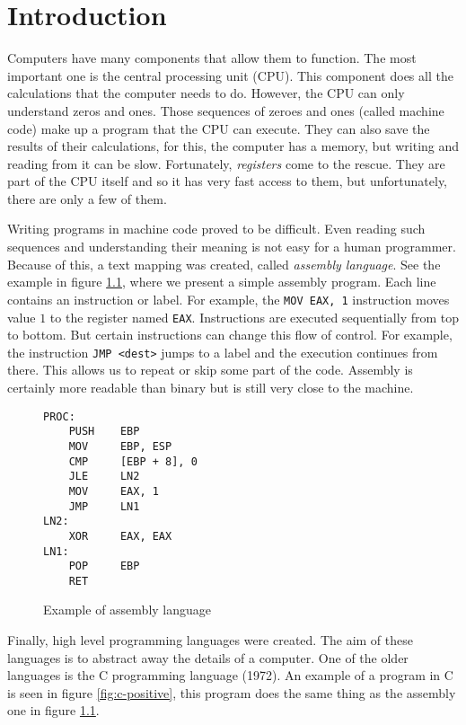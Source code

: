 \chapter{Introduction}
Computers have many components that allow them to function. The most important
one is the central processing unit (CPU). This component does all the
calculations that the computer needs to do. However, the CPU can only
understand zeros and ones. Those sequences of zeroes and ones (called machine
code) make up a program that the CPU can execute. They can also save the
results of their calculations, for this, the computer has a memory, but writing
and reading from it can be slow. Fortunately, \textit{registers} come to the
rescue. They are part of the CPU itself and so it has very fast access to them,
but unfortunately, there are only a few of them.

Writing programs in machine code proved to be difficult. Even reading such
sequences and understanding their meaning is not easy for a human programmer.
Because of this, a text mapping was created, called \textit{assembly language}.
See the example in figure \ref{fig:assembly-example}, where we present a simple
assembly program. Each line contains an instruction or label. For example, the
\texttt{MOV EAX, 1} instruction moves value $1$ to the register named
\texttt{EAX}. Instructions are executed sequentially from top to bottom. But
certain instructions can change this flow of control. For example, the
instruction \texttt{JMP <dest>} jumps to a label and the execution continues
from there. This allows us to repeat or skip some part of the code. Assembly is
certainly more readable than binary but is still very close to the machine.

\begin{figure}\label{fig:assembly-example}
\begin{lstlisting}
PROC:
    PUSH    EBP
    MOV     EBP, ESP
    CMP     [EBP + 8], 0
    JLE     LN2
    MOV     EAX, 1
    JMP     LN1
LN2:
    XOR     EAX, EAX
LN1:
    POP     EBP
    RET
\end{lstlisting}
\caption{Example of assembly language}
\end{figure}

Finally, high level programming languages were created. The aim of these
languages is to abstract away the details of a computer. One of the older
languages is the C programming language (1972). An example of a program in C is
seen in figure \ref{fig:c-positive}, this program does the same thing as the
assembly one in figure
\ref{fig:assembly-example}.

